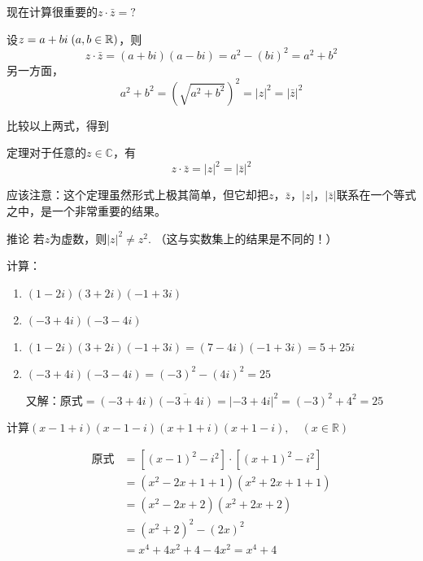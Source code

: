 现在计算很重要的$z\cdot \bar z=?$

设$z=a+bi\; (a,b\in\mathbb{R})$，则
\[z\cdot \bar z=(a+bi)(a-bi)=a^2-(bi)^2=a^2+b^2\]
另一方面，
\[a^2+b^2=(\sqrt{a^2+b^2})^2=|z|^2=|\bar z|^2\]

比较以上两式，得到

\begin{thm}
{定理}对于任意的$z\in\mathbb{C}$，有
\[z\cdot \bar z=|z|^2=|\bar z|^2\]    
\end{thm}


应该注意：这个定理虽然形式上极其简单，但它却把$z$，$\bar z$，$|z|$，$|\bar z|$联系在一个等式之中，是一个非常重要的结果。

\begin{thm}
    {推论} 若$z$为虚数，则$|z|^2\ne z^2$.
（这与实数集上的结果是不同的！）
\end{thm}

\begin{example}
计算：
\begin{multicols}{2}
\begin{enumerate}[(1)]
    \item $(1-2i)(3+2i)(-1+3i)$
    \item $(-3+4i)(-3-4i)$
\end{enumerate}
\end{multicols}
\end{example}

\begin{solution}
\begin{enumerate}[(1)]
    \item $(1-2i)(3+2i)(-1+3i)=(7-4i)(-1+3i)=5+25i$
    \item $(-3+4i)(-3-4i)=(-3)^2-(4i)^2=25$
    
又解：$\text{原式}=(-3+4i)\overline{(-3+4i)}=|-3+4i|^2=(-3)^2+4^2=25$
\end{enumerate}

    
\end{solution}


\begin{example}
    计算$(x-1+i)(x-1-i)(x+1+i)(x+1-i),\quad (x\in\mathbb{R})$
\end{example}

\begin{solution}
\[\begin{split}
\text{原式}&=\left[(x-1)^{2}-i^{2}\right]\cdot \left[(x+1)^{2}-i^{2}\right]\\
&=(x^{2}-2x+1+1)(x^{2}+2x+1+1)\\
&=(x^{2}-2x+2)(x^{2}+2x+2)\\
&=(x^{2}+2)^{2}-(2x)^{2}\\
&=x^{4}+4x^{2}+4-4x^{2} =x^{4}+4
\end{split}\]
\end{solution}

